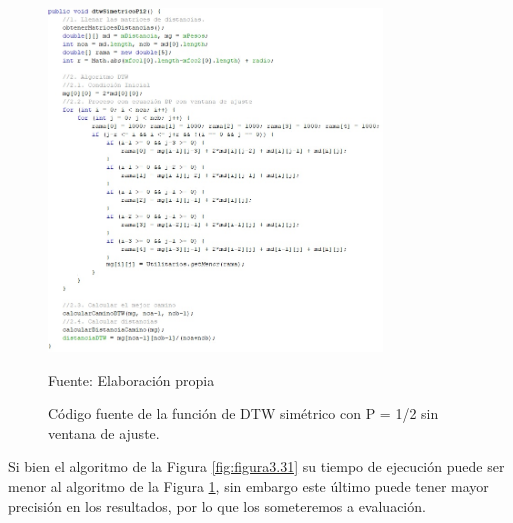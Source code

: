 \begin{enumerate}
\begin{figure}[H]
\begin{center}
\includegraphics[width=0.79\textwidth]{Imagenes/Cap3/image032}
\end{center}
\begin{center}
\vskip -0.5cm
\caption{\small{Código fuente de la función de DTW simétrico con P = 1/2 sin ventana de ajuste.}}
\label{fig:figura3.32}
{\small{Fuente: Elaboración propia}}
\end{center}
\end{figure}
\vskip -0.5cm
Si bien el algoritmo de la Figura \ref{fig:figura3.31} su tiempo de ejecución puede ser menor al algoritmo de la Figura \ref{fig:figura3.32}, sin embargo este último puede tener mayor precisión en los resultados, por lo que los someteremos a evaluación.


\end{enumerate}
